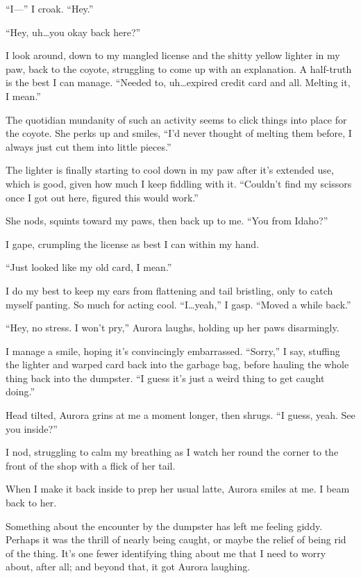 ``I---'' I croak. ``Hey.''

``Hey, uh\ldots{}you okay back here?''

I look around, down to my mangled license and the shitty yellow lighter in my paw, back to the coyote, struggling to come up with an explanation. A half-truth is the best I can manage. ``Needed to, uh\ldots{}expired credit card and all. Melting it, I mean.''

The quotidian mundanity of such an activity seems to click things into place for the coyote. She perks up and smiles, ``I'd never thought of melting them before, I always just cut them into little pieces.''

The lighter is finally starting to cool down in my paw after it's extended use, which is good, given how much I keep fiddling with it. ``Couldn't find my scissors once I got out here, figured this would work.''

She nods, squints toward my paws, then back up to me. ``You from Idaho?''

I gape, crumpling the license as best I can within my hand.

``Just looked like my old card, I mean.''

I do my best to keep my ears from flattening and tail bristling, only to catch myself panting. So much for acting cool. ``I\ldots{}yeah,'' I gasp. ``Moved a while back.''

``Hey, no stress. I won't pry,'' Aurora laughs, holding up her paws disarmingly.

I manage a smile, hoping it's convincingly embarrassed. ``Sorry,'' I say, stuffing the lighter and warped card back into the garbage bag, before hauling the whole thing back into the dumpster. ``I guess it's just a weird thing to get caught doing.''

Head tilted, Aurora grins at me a moment longer, then shrugs. ``I guess, yeah. See you inside?''

I nod, struggling to calm my breathing as I watch her round the corner to the front of the shop with a flick of her tail.

When I make it back inside to prep her usual latte, Aurora smiles at me. I beam back to her.

Something about the encounter by the dumpster has left me feeling giddy. Perhaps it was the thrill of nearly being caught, or maybe the relief of being rid of the thing. It's one fewer identifying thing about me that I need to worry about, after all; and beyond that, it got Aurora laughing.

